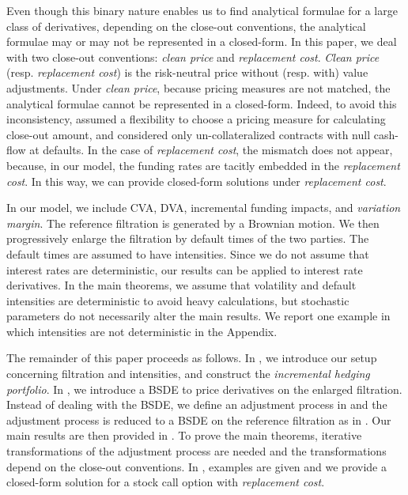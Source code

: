 \documentclass[a4paper, 11pt]{article}              %
\numberwithin{equation}{section}
\theoremstyle{plain}
\newcommand{\1}{\mathds{1}}
\theoremstyle{plain}
\theoremstyle{definition}
\theoremstyle{plain}
\begin{document}
Even though this binary nature enables us to find analytical formulae for a
large class of derivatives, depending on the close-out conventions, the
analytical formulae may or may not be represented in a closed-form. In this
paper, we deal with two close-out conventions: \textit{clean price} and
\textit{replacement cost}. \textit{Clean price} (resp. \textit{replacement
  cost}) is the risk-neutral price without (resp. with) value adjustments. Under
\textit{clean price}, because pricing measures are not matched, the analytical
formulae cannot be represented in a closed-form. Indeed, to avoid this
inconsistency, \cite{bichuch2017arbitrage} assumed a flexibility to choose a
pricing measure for calculating close-out amount, and \cite{brigo2017funding}
considered only un-collateralized contracts with null cash-flow at defaults. In
the case of \textit{replacement cost}, the mismatch does not appear, because, in
our model, the funding rates are tacitly embedded in the \textit{replacement
  cost}.  In this way, we can provide closed-form solutions under
\textit{replacement cost}.

In our model, we include CVA, DVA, incremental funding impacts, and 
\textit{variation margin}. The reference filtration is generated by a Brownian
motion. We then progressively enlarge the filtration by default times of the two
parties. The default times are assumed to have intensities. Since we do not assume
that interest rates are deterministic, our results can be applied to interest
rate derivatives. In the main theorems, we assume that volatility and default
intensities are deterministic to avoid heavy calculations, but stochastic
parameters do not necessarily alter the main results.  We report one example
in which intensities are not deterministic in the Appendix.

The remainder of this paper proceeds as follows. In , we
introduce our setup concerning filtration and intensities, and construct the
\textit{incremental hedging portfolio}. In , we introduce a BSDE
to price derivatives on the enlarged filtration. Instead of dealing with the
BSDE, we define an adjustment process in  and the adjustment
process is reduced to a BSDE on the reference filtration as in
\cite{crepey2015bsdes}. Our main results are then provided in
. To prove the main theorems, iterative transformations of the
adjustment process are needed and the transformations depend on the close-out
conventions. In , examples are given and we provide a
closed-form solution for a stock call option with \textit{replacement cost}.
 
\end{document}
